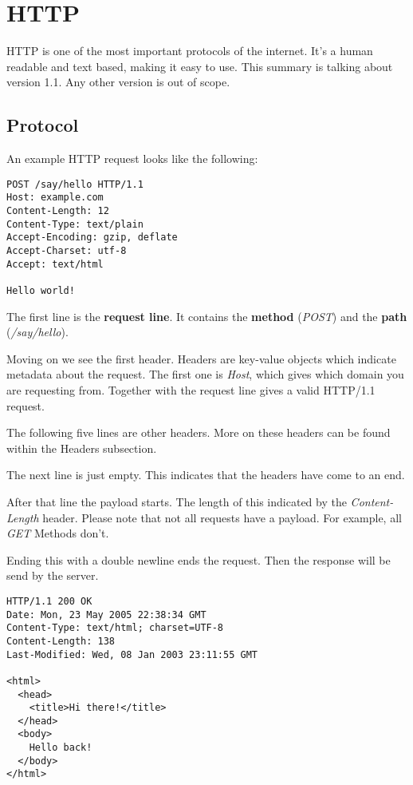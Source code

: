 \section{HTTP}
HTTP is one of the most important protocols of the internet.
It's a human readable and text based, making it easy to use.
This summary is talking about version 1.1.
Any other version is out of scope.

\subsection{Protocol}
An example HTTP request looks like the following:

\begin{lstlisting}
POST /say/hello HTTP/1.1
Host: example.com
Content-Length: 12
Content-Type: text/plain
Accept-Encoding: gzip, deflate
Accept-Charset: utf-8
Accept: text/html

Hello world!
\end{lstlisting}

The first line is the {\bf request line}.
It contains the {\bf method} ({\it POST}) and the {\bf path} ({\it /say/hello}).

Moving on we see the first header.
Headers are key-value objects which indicate metadata about the request.
The first one is {\it Host}, which gives which domain you are requesting from.
Together with the request line gives a valid HTTP/1.1 request.

The following five lines are other headers.
More on these headers can be found within the Headers subsection.

The next line is just empty.
This indicates that the headers have come to an end.

After that line the payload starts.
The length of this indicated by the {\it Content-Length} header.
Please note that not all requests have a payload.
For example, all {\it GET} Methods don't.

Ending this with a double newline ends the request.
Then the response will be send by the server.

\begin{lstlisting}
HTTP/1.1 200 OK
Date: Mon, 23 May 2005 22:38:34 GMT
Content-Type: text/html; charset=UTF-8
Content-Length: 138
Last-Modified: Wed, 08 Jan 2003 23:11:55 GMT

<html>
  <head>
    <title>Hi there!</title>
  </head>
  <body>
    Hello back!
  </body>
</html>
\end{lstlisting}

